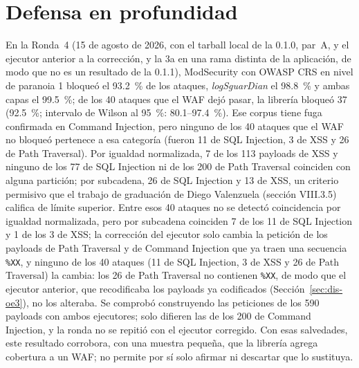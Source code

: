 \section{Defensa en profundidad}
\label{sec:dis-defensa}

En la Ronda~4 (15 de agosto de 2026, con el tarball local de la 0.1.0, par~A, y el ejecutor anterior
a la corrección, y la 3a en una rama distinta de la aplicación, de modo que no es un resultado
de la 0.1.1), ModSecurity con OWASP CRS en nivel de
paranoia 1 bloqueó el 93.2~\% de los ataques, \textit{logSguarDian} el 98.8~\% y ambas capas el
99.5~\%; de los 40 ataques que el WAF dejó pasar, la librería bloqueó 37 (92.5~\%; intervalo de
Wilson al 95~\%: 80.1--97.4~\%). Ese corpus tiene fuga confirmada en Command Injection, pero
ninguno de los 40 ataques que el WAF no bloqueó pertenece a esa categoría (fueron 11 de SQL
Injection, 3 de XSS y 26 de Path Traversal). Por igualdad normalizada, 7 de los 113 payloads de XSS
y ninguno de los 77 de SQL Injection ni de los 200 de Path Traversal coinciden con alguna partición;
por subcadena, 26 de SQL Injection y 13 de XSS, un criterio permisivo que el trabajo de graduación
de Diego Valenzuela \cite{valenzuela2026ia} (sección VIII.3.5) califica de límite superior. Entre
esos 40 ataques no se detectó coincidencia por igualdad normalizada, pero por subcadena coinciden 7
de los 11 de SQL Injection y 1 de los 3 de XSS; la corrección del ejecutor solo cambia la
petición de los payloads de Path Traversal y de Command Injection que ya traen una secuencia
\texttt{\%XX}, y ninguno de los 40 ataques (11 de SQL Injection, 3 de XSS y 26 de Path Traversal)
la cambia: los 26 de Path Traversal no contienen \texttt{\%XX}, de modo que el ejecutor anterior,
que recodificaba los payloads ya codificados (Sección~\ref{sec:dis-oe3}), no los alteraba. Se
comprobó construyendo las peticiones de los 590 payloads con ambos ejecutores; solo difieren las de
los 200 de Command Injection, y la ronda no se repitió con el ejecutor corregido. Con esas salvedades, este
resultado corrobora, con una muestra pequeña, que la librería agrega cobertura a un WAF; no permite
por sí solo afirmar ni descartar que lo sustituya.

